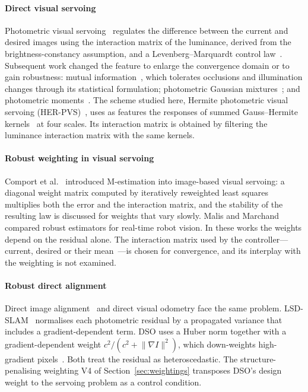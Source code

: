 \documentclass[preprint,12pt]{elsarticle}
\theoremstyle{remark}
\begin{document}
\paragraph{Direct visual servoing}
Photometric visual servoing~\cite{collewet2008setfree,collewet2011photometric}
regulates the difference between the current and desired images using the
interaction matrix of the luminance, derived from the brightness-constancy
assumption, and a Levenberg--Marquardt control law~\cite{marquardt1963}.
Subsequent work changed the feature to enlarge the convergence domain or to
gain robustness: mutual information~\cite{dame2011mutual}, which tolerates
occlusions and illumination changes through its statistical formulation;
photometric Gaussian mixtures~\cite{crombez2019pgm}; and photometric
moments~\cite{bakthavatchalam2018moments}. The scheme studied here,
Hermite photometric visual servoing (HER-PVS)~\cite{herpvs}, uses as features
the responses of summed Gauss--Hermite kernels~\cite{martens1990hermite} at four
scales. Its interaction matrix is obtained by filtering the luminance
interaction matrix with the same kernels.

\paragraph{Robust weighting in visual servoing}
Comport et al.~\cite{comport2006robust} introduced M-estimation into
image-based visual servoing: a diagonal weight matrix computed by
iteratively reweighted least squares multiplies both the error and the
interaction matrix, and the stability of the resulting law is discussed for
weights that vary slowly. Malis and Marchand~\cite{malis2006robust} compared
robust estimators for real-time robot vision. In these works the weights depend
on the residual alone. The interaction matrix used by the controller---current,
desired or their mean~\cite{chaumette2006vs1,malis2004esm}---is chosen for
convergence, and its interplay with the weighting is not examined.

\paragraph{Robust direct alignment}
Direct image alignment~\cite{baker2004lk} and direct visual odometry face the
same problem. LSD-SLAM~\cite{engel2014lsd} normalises each photometric residual
by a propagated variance that includes a gradient-dependent term. DSO uses a
Huber norm together with a gradient-dependent weight
$c^{2}/(c^{2}+\lVert\nabla I\rVert^{2})$, which down-weights high-gradient
pixels~\cite{engel2018dso}. Both treat the residual as heteroscedastic. The
structure-penalising weighting V4 of Section~\ref{sec:weightings} transposes
DSO's design weight to the servoing problem as a control condition.
\end{document}
